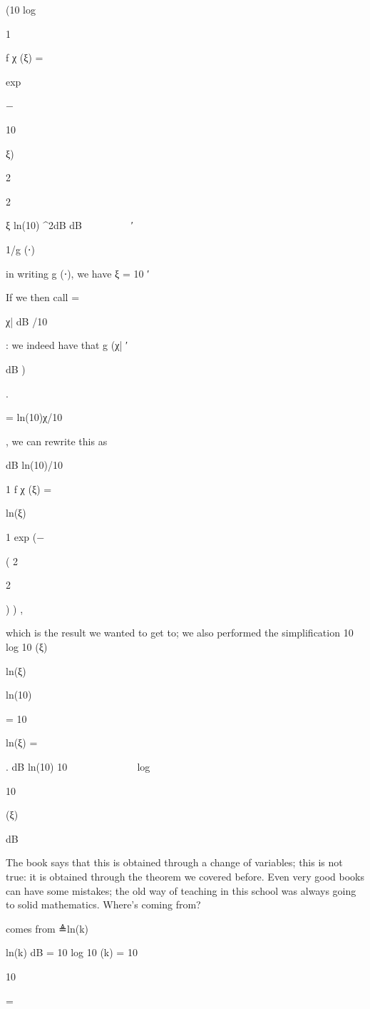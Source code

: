 {{{{(10 log

1

f χ (ξ) =

exp

−

10

ξ)

2

2

ξ ln(10) \pi\sigma^2\sigma dB dB





⎝
⎠
′

1/g (⋅)

in writing g (⋅), we have ξ = 10
′

If we then call \sigma = \sigma

χ| dB /10

: we indeed have that g (χ|
′

dB )

.

= ln(10)χ/10

, we can rewrite this as

dB ln(10)/10

1 f χ (ξ) =

ln(ξ)

1 exp (−

(
2

\pi{}

2

) ) ,
\sigma

which is the result we wanted to get to; we also performed the simplification 10 log 10 (ξ)

ln(ξ)

ln(10)

= 10

ln(ξ)
=

.
\sigma dB ln(10)
10\sigma
\sigma





  


log

10

(ξ)

\sigma dB

The book says that this is obtained through a change of variables; this is not true: it is obtained through the theorem we covered before.
Even very good books can have some mistakes; the old way of teaching in this school was always going to solid mathematics.
​Where's \sigma coming from?

\sigma

comes from
\sigma≜ln(k)

ln(k)
\sigma dB = 10 log 10 (k) = 10

10

=

}}}}
